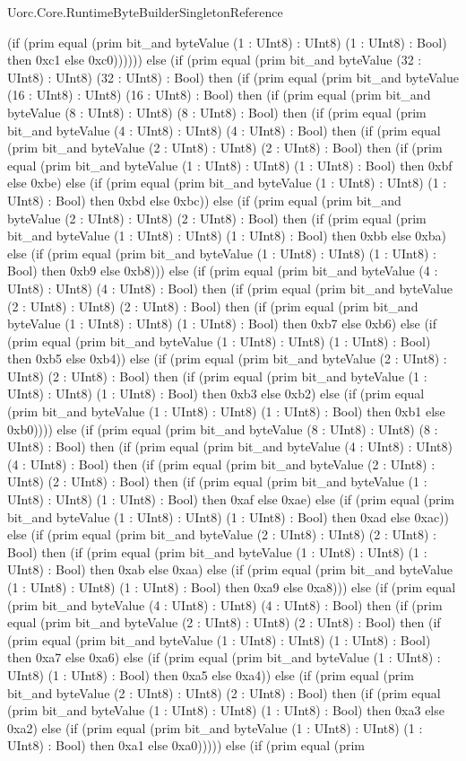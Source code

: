\begin{lexlean}{Uorc.Core.RuntimeByteBuilderSingletonReference}
\begin{semanticmodule}
{(if (prim equal (prim bit_and byteValue (1 : UInt8) : UInt8) (1 : UInt8) : Bool) then 0xc1 else 0xc0)))))) else (if (prim equal (prim bit_and byteValue (32 : UInt8) : UInt8) (32 : UInt8) : Bool) then (if (prim equal (prim bit_and byteValue (16 : UInt8) : UInt8) (16 : UInt8) : Bool) then (if (prim equal (prim bit_and byteValue (8 : UInt8) : UInt8) (8 : UInt8) : Bool) then (if (prim equal (prim bit_and byteValue (4 : UInt8) : UInt8) (4 : UInt8) : Bool) then (if (prim equal (prim bit_and byteValue (2 : UInt8) : UInt8) (2 : UInt8) : Bool) then (if (prim equal (prim bit_and byteValue (1 : UInt8) : UInt8) (1 : UInt8) : Bool) then 0xbf else 0xbe) else (if (prim equal (prim bit_and byteValue (1 : UInt8) : UInt8) (1 : UInt8) : Bool) then 0xbd else 0xbc)) else (if (prim equal (prim bit_and byteValue (2 : UInt8) : UInt8) (2 : UInt8) : Bool) then (if (prim equal (prim bit_and byteValue (1 : UInt8) : UInt8) (1 : UInt8) : Bool) then 0xbb else 0xba) else (if (prim equal (prim bit_and byteValue (1 : UInt8) : UInt8) (1 : UInt8) : Bool) then 0xb9 else 0xb8))) else (if (prim equal (prim bit_and byteValue (4 : UInt8) : UInt8) (4 : UInt8) : Bool) then (if (prim equal (prim bit_and byteValue (2 : UInt8) : UInt8) (2 : UInt8) : Bool) then (if (prim equal (prim bit_and byteValue (1 : UInt8) : UInt8) (1 : UInt8) : Bool) then 0xb7 else 0xb6) else (if (prim equal (prim bit_and byteValue (1 : UInt8) : UInt8) (1 : UInt8) : Bool) then 0xb5 else 0xb4)) else (if (prim equal (prim bit_and byteValue (2 : UInt8) : UInt8) (2 : UInt8) : Bool) then (if (prim equal (prim bit_and byteValue (1 : UInt8) : UInt8) (1 : UInt8) : Bool) then 0xb3 else 0xb2) else (if (prim equal (prim bit_and byteValue (1 : UInt8) : UInt8) (1 : UInt8) : Bool) then 0xb1 else 0xb0)))) else (if (prim equal (prim bit_and byteValue (8 : UInt8) : UInt8) (8 : UInt8) : Bool) then (if (prim equal (prim bit_and byteValue (4 : UInt8) : UInt8) (4 : UInt8) : Bool) then (if (prim equal (prim bit_and byteValue (2 : UInt8) : UInt8) (2 : UInt8) : Bool) then (if (prim equal (prim bit_and byteValue (1 : UInt8) : UInt8) (1 : UInt8) : Bool) then 0xaf else 0xae) else (if (prim equal (prim bit_and byteValue (1 : UInt8) : UInt8) (1 : UInt8) : Bool) then 0xad else 0xac)) else (if (prim equal (prim bit_and byteValue (2 : UInt8) : UInt8) (2 : UInt8) : Bool) then (if (prim equal (prim bit_and byteValue (1 : UInt8) : UInt8) (1 : UInt8) : Bool) then 0xab else 0xaa) else (if (prim equal (prim bit_and byteValue (1 : UInt8) : UInt8) (1 : UInt8) : Bool) then 0xa9 else 0xa8))) else (if (prim equal (prim bit_and byteValue (4 : UInt8) : UInt8) (4 : UInt8) : Bool) then (if (prim equal (prim bit_and byteValue (2 : UInt8) : UInt8) (2 : UInt8) : Bool) then (if (prim equal (prim bit_and byteValue (1 : UInt8) : UInt8) (1 : UInt8) : Bool) then 0xa7 else 0xa6) else (if (prim equal (prim bit_and byteValue (1 : UInt8) : UInt8) (1 : UInt8) : Bool) then 0xa5 else 0xa4)) else (if (prim equal (prim bit_and byteValue (2 : UInt8) : UInt8) (2 : UInt8) : Bool) then (if (prim equal (prim bit_and byteValue (1 : UInt8) : UInt8) (1 : UInt8) : Bool) then 0xa3 else 0xa2) else (if (prim equal (prim bit_and byteValue (1 : UInt8) : UInt8) (1 : UInt8) : Bool) then 0xa1 else 0xa0))))) else (if (prim equal (prim }
\end{semanticmodule}
\end{lexlean}
